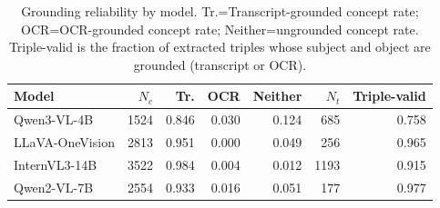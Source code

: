 \begin{table}[t]
\centering
\small
\begin{tabular}{lrrrrrr}
\toprule
Model & $N_c$ & Tr. & OCR & Neither & $N_t$ & Triple-valid \\
\midrule
Qwen3-VL-4B & 1524 & 0.846 & 0.030 & 0.124 & 685 & 0.758 \\
LLaVA-OneVision & 2813 & 0.951 & 0.000 & 0.049 & 256 & 0.965 \\
InternVL3-14B & 3522 & 0.984 & 0.004 & 0.012 & 1193 & 0.915 \\
Qwen2-VL-7B & 2554 & 0.933 & 0.016 & 0.051 & 177 & 0.977 \\
\bottomrule
\end{tabular}
\caption{Grounding reliability by model. Tr.=Transcript-grounded concept rate; OCR=OCR-grounded concept rate; Neither=ungrounded concept rate. Triple-valid is the fraction of extracted triples whose subject and object are grounded (transcript or OCR).}
\label{tab:grounding}
\end{table}
